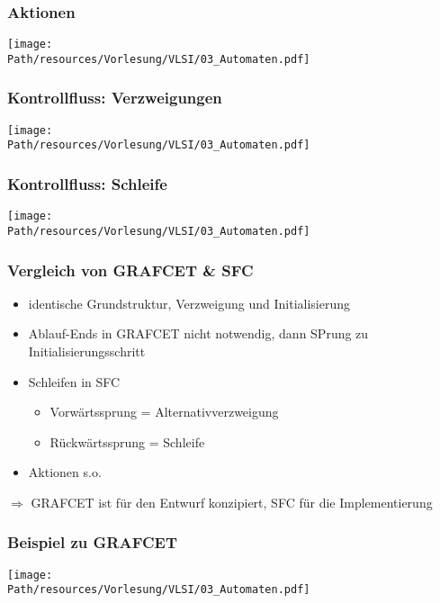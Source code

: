 	\subsubsection{Aktionen}
		\begin{center}
			\texttt{[image: \\Path/resources/Vorlesung/VLSI/03\_Automaten.pdf]}
		\end{center}
		
	\subsubsection{Kontrollfluss: Verzweigungen}
		\begin{center}
			\texttt{[image: \\Path/resources/Vorlesung/VLSI/03\_Automaten.pdf]}
		\end{center}
		
	\subsubsection{Kontrollfluss: Schleife}
		\begin{center}
			\texttt{[image: \\Path/resources/Vorlesung/VLSI/03\_Automaten.pdf]}
		\end{center}
		
	\subsubsection{Vergleich von GRAFCET \& SFC}
		\begin{itemize}
			\item identische Grundstruktur, Verzweigung und Initialisierung
			\item Ablauf-Ends in GRAFCET nicht notwendig, dann SPrung zu Initialisierungsschritt
			\item Schleifen in SFC
				\begin{itemize}
					\item Vorwärtssprung = Alternativverzweigung
					\item Rückwärtssprung = Schleife
				\end{itemize}
			\item Aktionen s.o.
		\end{itemize}
		$\Rightarrow$ GRAFCET ist für den Entwurf konzipiert, SFC für die Implementierung
		
	\subsubsection{Beispiel zu GRAFCET}
		\begin{center}
			\texttt{[image: \\Path/resources/Vorlesung/VLSI/03\_Automaten.pdf]}
		\end{center}
		


